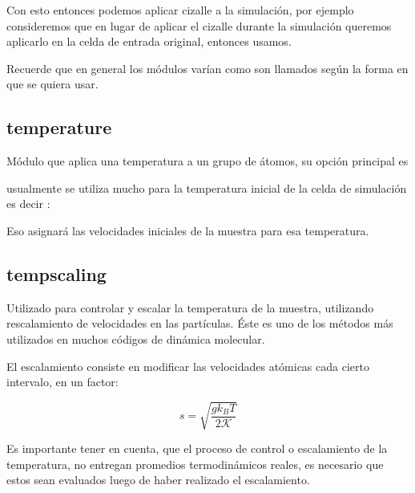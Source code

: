 
Con esto entonces podemos aplicar cizalle a la simulaci\'on, por ejemplo
consideremos que en lugar de aplicar el cizalle durante la simulaci\'on queremos
aplicarlo en la celda de entrada original, entonces usamos.


Recuerde que en general los m\'odulos var\'ian como son llamados seg\'un la
forma en que se quiera usar.

\subsection{temperature}
M\'odulo que aplica una temperatura a un grupo de \'atomos, su opci\'on
principal es


usualmente se utiliza mucho para la temperatura inicial de la celda de
simulaci\'on es decir :


Eso asignar\'a las velocidades iniciales de la muestra para esa temperatura.

\subsection{tempscaling}

Utilizado para controlar y escalar la temperatura de la muestra, utilizando
rescalamiento de velocidades en las part\'iculas. \'Este es uno de los m\'etodos
m\'as utilizados en muchos c\'odigos de din\'amica molecular.

El escalamiento consiste en modificar las velocidades at\'omicas cada cierto
intervalo, en un factor:

$$s=\sqrt{\frac{gk_BT}{2\mathcal{K}}}$$

Es importante tener en cuenta, que el proceso de control o escalamiento de la
temperatura, no entregan promedios termodin\'amicos reales, es necesario que
estos sean evaluados luego de haber realizado el escalamiento.

